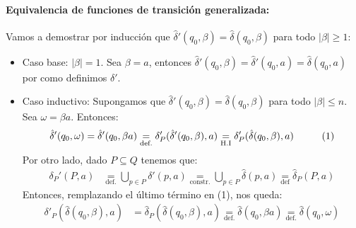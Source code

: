 \paragraph{Equivalencia de funciones de transición generalizada:} Vamos a demostrar por inducción que \(\hat\delta'(q_0,\beta) = \hat\delta(q_0,\beta)\) para todo \(|\beta|\geq 1\):
\begin{itemize}
  \item Caso base: \(|\beta|=1\). Sea \(\beta = a\), entonces \(\hat\delta'(q_0,\beta) = \hat\delta'(q_0, a) = \hat\delta(q_0, a)\) por como definimos \(\delta'\).
  \item Caso inductivo: Supongamos que \(\hat\delta'(q_0,\beta) = \hat\delta(q_0,\beta)\) para todo \(|\beta|\leq n\). Sea \(\omega = \beta a\). Entonces:
        \begin{align*}
          \hat\delta'(q_0,\omega) & = \hat\delta'(q_0,\beta a) \underset{\text{def.}}{=} \delta'_P(\hat\delta'(q_0,\beta), a) \underset{\text{H.I}}{=} \delta'_P  (\hat\delta(q_0,\beta), a)\hspace*{1cm}(1) \\
        \end{align*}
        Por otro lado, dado \(P \subseteq Q\) tenemos que:
        \begin{align*}
          \delta_P'(P, a) & \underset{\text{def.}}{=} \bigcup_{p\in P} \delta'(p, a) \underset{\text{constr.}}{=} \bigcup_{p\in P} \hat\delta(p, a)\underset{\text{def}}{=} \hat\delta_P(P,a)
        \end{align*}
        Entonces, remplazando el último término en (1), nos queda:
        \begin{align*}
          \delta'_P(\hat\delta(q_0,\beta), a) & = \hat\delta_P(\hat\delta(q_0,\beta), a) \underset{\text{def.}}{=} \hat\delta(q_0,\beta a) \underset{\text{def.}}{=} \hat\delta(q_0,\omega)
        \end{align*}
\end{itemize}

